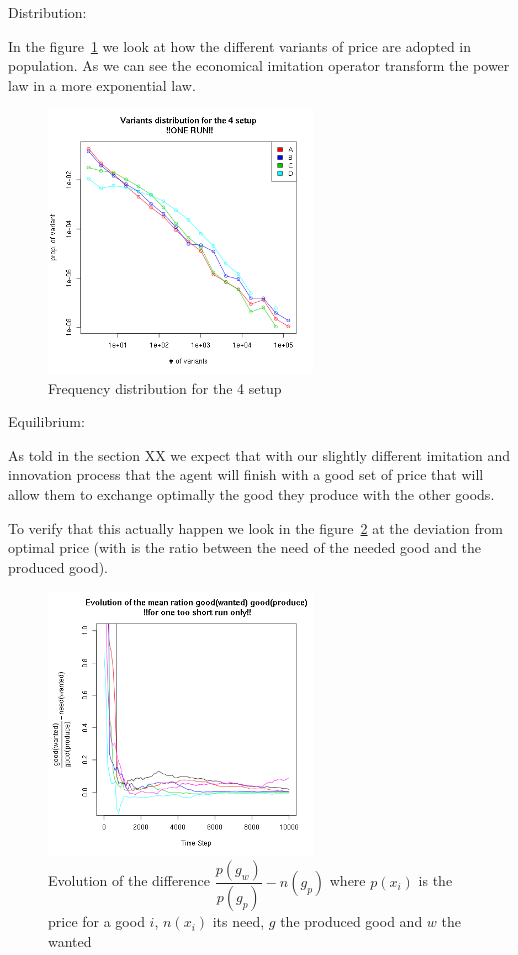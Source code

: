 \documentclass{wscpaperproc}
\begin{document}
Distribution:

In the figure~\ref{fig:4setDi} we look at how the different variants of price are adopted in population. As we can see the economical imitation operator transform the power law in a more exponential law.
\begin{figure}[htpb]
	\begin{center}
		\includegraphics[width=7cm]{img/4SetupDistrib.png}
	\end{center}
	\caption{Frequency distribution for the 4 setup}
	\label{fig:4setDi}
\end{figure}




Equilibrium:

As told in the section XX we expect that with our slightly different imitation and innovation process that the agent will finish with a good set of price that will allow them to exchange optimally the good they produce with the other goods.


To verify that this actually happen we look in the figure~\ref{fig:ratioEvol} at the deviation from optimal price (with is the ratio between the need of the needed good and the produced good).
\begin{figure}[htp]
	\begin{center}
		\includegraphics[width=7cm]{img/ratioEvol.png}
	\end{center}
	\caption{Evolution of the difference $\dfrac{p(g_w)}{p(g_p)}-n(g_p)$ where $p(x_i)$ is the price for a good $i$, $n(x_i)$ its need, $g$ the produced good and $w$ the wanted}
	\label{fig:ratioEvol}
\end{figure}
\end{document}
